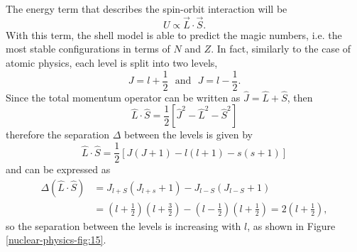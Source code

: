 The energy term that describes the spin-orbit interaction will be
\begin{equation*}
    U \propto \Vec{L}\cdot\Vec{S}.
\end{equation*}
With this term, the shell model is able to predict the magic numbers, i.e. the most stable configurations in terms of \(N\) and \(Z\).
In fact, similarly to the case of atomic physics, each level is split into two levels,
\begin{equation*}
    J = l + \frac{1}{2}\,\,\,\,\mbox{and}\,\,\,\,J = l - \frac{1}{2}.
\end{equation*}
 Since the total momentum operator can be written as $\hat{J} = \hat{L} + \hat{S}$, then
\begin{equation*}
    \hat{L}\cdot\hat{S} = \frac{1}{2}\left[\hat{J}^2-\hat{L}^2-\hat{S}^2\right]
\end{equation*}
therefore the separation \(\Delta\) between the levels is given by
\begin{equation*}
    \hat{L}\cdot\hat{S} = \frac{1}{2}\left[J(J+1) - l(l+1) - s(s+1)\right]
\end{equation*}
and can be expressed as
\begin{equation*}
\begin{split}
    \Delta(\hat{L}\cdot\hat{S}) & = J_{l+S}(J_{l+s}+1) - J_{l-S}(J_{l-S}+1) \\
    & = (l+\frac{1}{2})(l+\frac{3}{2}) - (l-\frac{1}{2})(l+\frac{1}{2}) = 2(l+\frac{1}{2}),
\end{split}
\end{equation*}
so the separation between the levels is increasing with \(l\), as shown in Figure \ref{nuclear-physics-fig:15}. 
